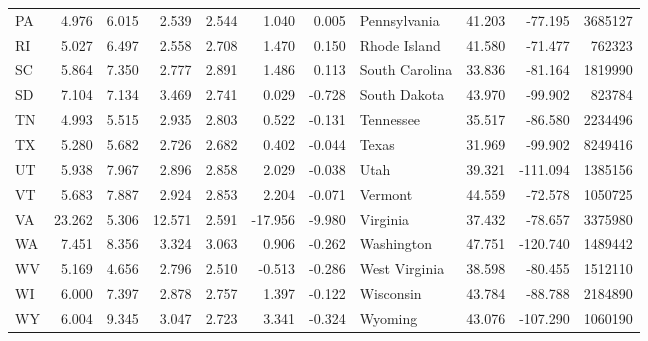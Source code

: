 \begin{tabular}{lrrrrrrlrrr}
PA & 4.976 & 6.015 & 2.539 & 2.544 & 1.040 & 0.005 & Pennsylvania & 41.203 & -77.195 & 3685127 \\
RI & 5.027 & 6.497 & 2.558 & 2.708 & 1.470 & 0.150 & Rhode Island & 41.580 & -71.477 & 762323 \\
SC & 5.864 & 7.350 & 2.777 & 2.891 & 1.486 & 0.113 & South Carolina & 33.836 & -81.164 & 1819990 \\
SD & 7.104 & 7.134 & 3.469 & 2.741 & 0.029 & -0.728 & South Dakota & 43.970 & -99.902 & 823784 \\
TN & 4.993 & 5.515 & 2.935 & 2.803 & 0.522 & -0.131 & Tennessee & 35.517 & -86.580 & 2234496 \\
TX & 5.280 & 5.682 & 2.726 & 2.682 & 0.402 & -0.044 & Texas & 31.969 & -99.902 & 8249416 \\
UT & 5.938 & 7.967 & 2.896 & 2.858 & 2.029 & -0.038 & Utah & 39.321 & -111.094 & 1385156 \\
VT & 5.683 & 7.887 & 2.924 & 2.853 & 2.204 & -0.071 & Vermont & 44.559 & -72.578 & 1050725 \\
VA & 23.262 & 5.306 & 12.571 & 2.591 & -17.956 & -9.980 & Virginia & 37.432 & -78.657 & 3375980 \\
WA & 7.451 & 8.356 & 3.324 & 3.063 & 0.906 & -0.262 & Washington & 47.751 & -120.740 & 1489442 \\
WV & 5.169 & 4.656 & 2.796 & 2.510 & -0.513 & -0.286 & West Virginia & 38.598 & -80.455 & 1512110 \\
WI & 6.000 & 7.397 & 2.878 & 2.757 & 1.397 & -0.122 & Wisconsin & 43.784 & -88.788 & 2184890 \\
WY & 6.004 & 9.345 & 3.047 & 2.723 & 3.341 & -0.324 & Wyoming & 43.076 & -107.290 & 1060190 \\
\bottomrule
\end{tabular}
